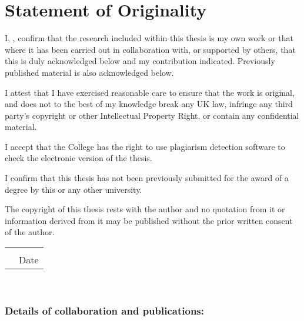 \chapter*{Statement of Originality}

I, \textit{\theauthor}, confirm that the research included within this thesis is my own work or that where it has been carried out in collaboration with, or supported by others, that this is duly acknowledged below and my contribution indicated.
Previously published material is also acknowledged below.

I attest that I have exercised reasonable care to ensure that the work is original, and does not to the best of my knowledge break any UK law, infringe any third party's copyright or other Intellectual Property Right, or contain any confidential material.

I accept that the College has the right to use plagiarism detection software to check the electronic version of the thesis.

I confirm that this thesis has not been previously submitted for the award of a degree by this or any other university.

The copyright of this thesis rests with the author and no quotation from it or information derived from it may be published without the prior written consent of the author.

\vspace{10mm}
\noindent\begin{tabular}{ll}
	\makebox[70mm]{\hrulefill} & \makebox[40mm]{\hrulefill}\\
	\textsf{\textit{\theauthor}} & \textsf{Date}\\
\end{tabular}\\

\subsection*{Details of collaboration and publications:}